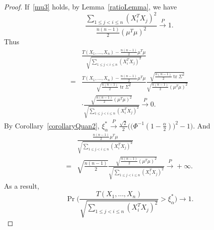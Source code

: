 \documentclass[smallcondensed,final,natbib]{svjour3}          %
\DeclareMathOperator{\mytr}{tr}
\begin{document}
\begin{proof}
    If~\eqref{mu3} holds, by Lemma~\ref{ratioLemma}, we have
    \begin{equation*}
    \frac{\sum_{1\leq j< i\leq n}(X_i^T X_j)^2}{\frac{n(n-1)}{2}{(\mu^T\mu)}^2}\xrightarrow{P}1.
    \end{equation*}
    Thus
    \begin{equation*}
        \begin{aligned}
            &\frac{T( X_1,\ldots, X_n)-\frac{n(n-1)}{2}\mu^T\mu}{\sqrt{\sum_{1\leq j<i\leq n}{(X_i^T X_j)}^2}}        \\
            =&\frac{T( X_1,\ldots, X_n)-\frac{n(n-1)}{2}\mu^T\mu}{\sqrt{\frac{n(n-1)}{2}\mytr \Sigma^2}}
            \frac{\sqrt{\frac{n(n-1)}{2}\mytr \Sigma^2}}{\sqrt{\frac{n(n-1)}{2}{(\mu^T \mu)}^2}}        \\
            &\cdot
            \frac{\sqrt{\frac{n(n-1)}{2}{(\mu^T \mu)}^2}}{\sqrt{\sum_{1\leq j<i\leq n}{(X_i^T X_j)}^2}}        
            \xrightarrow{P} 0.
        \end{aligned}
    \end{equation*}
    By Corollary~\ref{corollaryQuan2}, $\xi_{\alpha}^*\xrightarrow{P}\frac{\sqrt{2}}{2}\Big(\big(\Phi^{-1}(1-\frac{\alpha}{2})\big)^2-1\Big)$. And 
    \begin{equation*}
        \begin{aligned}
            &\frac{\frac{n(n-1)}{2}\mu^T\mu}{\sqrt{\sum_{1\leq j<i\leq n}{(X_i^T X_j)}^2}}\\
            =&
    \sqrt{\frac{n(n-1)}{2}}\frac{\sqrt{\frac{n(n-1)}{2}(\mu^T\mu)^2}}{\sqrt{\sum_{1\leq j<i\leq n}{(X_i^T X_j)}^2}}
    \xrightarrow{P}+\infty.
        \end{aligned}
    \end{equation*}
    As a result,
    \begin{equation*}
        \Pr\Big(\frac{T( X_1,\ldots, X_n)}{\sqrt{\sum_{1\leq j<i\leq n}{(X_i^T X_j)}^2}}>\xi_{\alpha}^* \Big)
    \to 1.
    \end{equation*}


\end{proof}
\end{document}
